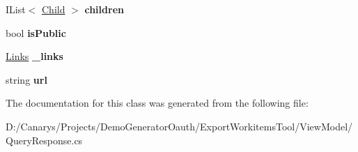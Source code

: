 \begin{DoxyCompactItemize}
I\+List$<$ \mbox{\hyperlink{class_templates_generator_tool_1_1_view_model_1_1_query_response_1_1_child}{Child}} $>$ {\bfseries children}
\item 
\mbox{\label{class_templates_generator_tool_1_1_view_model_1_1_query_response_1_1_value_a1a5b43259c8508f2b6ab797e5b5894f4}} 
bool {\bfseries is\+Public}
\item 
\mbox{\label{class_templates_generator_tool_1_1_view_model_1_1_query_response_1_1_value_a3b62bf293b076ada7f68a202fc948a82}} 
\mbox{\hyperlink{class_templates_generator_tool_1_1_view_model_1_1_query_response_1_1_links}{Links}} {\bfseries \+\_\+links}
\item 
\mbox{\label{class_templates_generator_tool_1_1_view_model_1_1_query_response_1_1_value_a2e0afa0d17c35da7bb967ff6c18788a5}} 
string {\bfseries url}
\end{DoxyCompactItemize}


The documentation for this class was generated from the following file\+:\begin{DoxyCompactItemize}
\item 
D\+:/\+Canarys/\+Projects/\+Demo\+Generator\+Oauth/\+Export\+Workitems\+Tool/\+View\+Model/Query\+Response.\+cs\end{DoxyCompactItemize}
